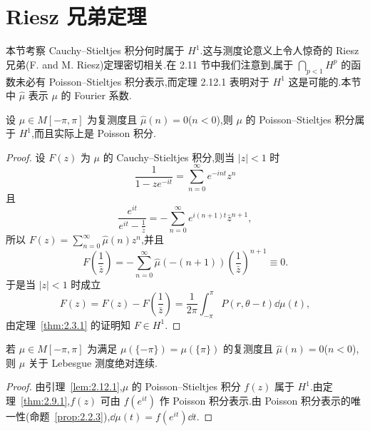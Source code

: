\section{Riesz 兄弟定理}\label{sec:2.12}


本节考察 Cauchy--Stieltjes 积分何时属于 $H^{1}$.这与测度论意义上令人惊奇的 Riesz 兄弟(F. and M. Riesz)定理密切相关.在 2.11 节中我们注意到,属于 $\bigcap_{p<1} H^{p}$ 的函数未必有 Poisson--Stieltjes 积分表示,而定理 2.12.1 表明对于 $H^{1}$ 这是可能的.本节中 $\hat{\mu}$ 表示 $\mu$ 的 Fourier 系数.

\begin{lemma}\label{lem:2.12.1}
设 $\mu \in M[-\pi,\pi]$ 为复测度且 $\hat{\mu}(n) = 0$($n < 0$),则 $\mu$ 的 Poisson--Stieltjes 积分属于 $H^{1}$,而且实际上是 Poisson 积分.
\end{lemma}

\begin{proof}
设 $F(z)$ 为 $\mu$ 的 Cauchy--Stieltjes 积分,则当 $|z| < 1$ 时
\begin{equation*}
\frac{1}{1 - ze^{-it}} = \sum_{n=0}^{\infty} e^{-int}z^{n}
\end{equation*}
且
\begin{equation*}
\frac{e^{it}}{e^{it} - \frac{1}{\bar{z}}} = -\sum_{n=0}^{\infty} e^{i(n+1)t}\bar{z}^{n+1},
\end{equation*}
所以 $F(z) = \sum_{n=0}^{\infty}\hat{\mu}(n)z^{n}$,并且
\begin{equation*}
F\left(\frac{1}{\bar{z}}\right) = -\sum_{n=0}^{\infty}\hat{\mu}(-(n+1))\left(\frac{1}{\bar{z}}\right)^{n+1} \equiv 0.
\end{equation*}
于是当 $|z| < 1$ 时成立
\begin{equation*}
F(z) = F(z) - F\left(\frac{1}{\bar{z}}\right) = \frac{1}{2\pi}\int_{-\pi}^{\pi} P(r, \theta - t)\dd \mu(t),
\end{equation*}
由定理~\ref{thm:2.3.1} 的证明知 $F \in H^{1}$.
\end{proof}

\begin{theorem}[Riesz 兄弟]\label{thm:2.12.2}
若 $\mu \in M[-\pi, \pi]$ 为满足 $\mu(\{-\pi\}) = \mu(\{\pi\})$ 的复测度且 $\hat{\mu}(n) = 0$($n < 0$),则 $\mu$ 关于 Lebesgue 测度绝对连续.
\end{theorem}

\begin{proof}
由引理~\ref{lem:2.12.1},$\mu$ 的 Poisson--Stieltjes 积分 $f(z)$ 属于 $H^{1}$.由定理~\ref{thm:2.9.1},$f(z)$ 可由 $f(e^{it})$ 作 Poisson 积分表示.由 Poisson 积分表示的唯一性(命题~\ref{prop:2.2.3}),$\dd \mu(t) = f(e^{it})\dd t$.
\end{proof}

